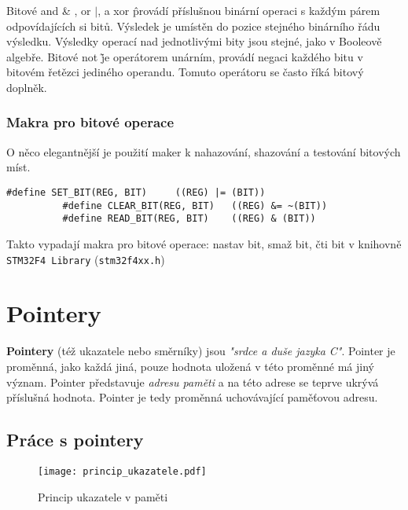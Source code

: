       Bitové and \& , or \(\lvert\), a xor \^ provádí příslušnou binární operaci s každým párem 
      odpovídajících si bitů. Výsledek je umístěn do pozice stejného binárního řádu výsledku. 
      Výsledky operací nad jednotlivými bity jsou  stejné, jako v Booleově algebře. Bitové not \~ 
      je operátorem unárním, provádí negaci každého bitu v bitovém řetězci jediného operandu. 
      Tomuto operátoru se často říká bitový doplněk. 
      
      \subsubsection{Makra pro bitové operace}
        O něco elegantnější je použití maker k nahazování, shazování a testování bitových míst. 
        \begin{lstlisting}[gobble=10, xrightmargin=13em]
          #define SET_BIT(REG, BIT)     ((REG) |= (BIT))
          #define CLEAR_BIT(REG, BIT)   ((REG) &= ~(BIT))
          #define READ_BIT(REG, BIT)    ((REG) & (BIT))
        \end{lstlisting}
       Takto vypadají makra pro bitové operace: nastav bit, smaž bit, čti bit v knihovně 
       \texttt{STM32F4 Library} (\texttt{stm32f4xx.h})
      
  \section{Pointery}
    \textbf{Pointery} (též ukazatele nebo směrníky) jsou \emph{"srdce a duše jazyka C"}. Pointer je 
    proměnná, jako každá jiná, pouze hodnota uložená v této proměnné má jiný význam. Pointer 
    představuje \textit{adresu paměti} a na této adrese se teprve ukrývá příslušná hodnota. Pointer 
    je tedy proměnná uchovávající paměťovou adresu.\cite{Herout}
  
    \subsection{Práce s pointery}
      \begin{figure}
        \centering
        \texttt{[image: princip\_ukazatele.pdf]}
        \caption{Princip ukazatele v paměti}
        \label{figure:pointer1}
      \end{figure}

        
